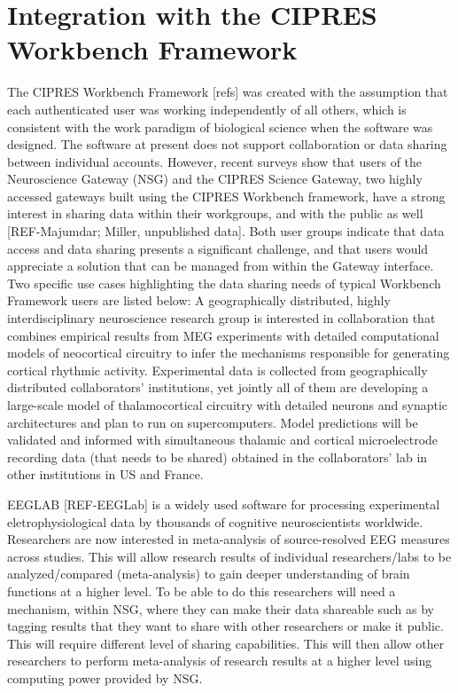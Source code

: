 \documentclass[sigconf]{acmart}
\begin{document}
\section{Integration with the CIPRES Workbench Framework}

The CIPRES Workbench Framework [refs] was created with the assumption that each authenticated user was working independently of all others, which is consistent with the work paradigm of biological science when the software was designed. The software at present does not support collaboration or data sharing between individual accounts. However, recent surveys show that users of the Neuroscience Gateway (NSG) and the CIPRES Science Gateway, two highly accessed gateways built using the CIPRES Workbench framework, have a strong interest in sharing data within their workgroups, and with the public as well [REF-Majumdar; Miller, unpublished data]. Both user groups indicate that data access and data sharing presents a significant challenge, and that users would appreciate a solution that can be managed from within the Gateway interface. Two specific use cases highlighting the data sharing needs of typical Workbench Framework users  are listed below:
A geographically distributed, highly interdisciplinary neuroscience research group is interested in collaboration that combines empirical results from MEG experiments with detailed computational models of neocortical circuitry to infer the mechanisms responsible for generating cortical rhythmic activity. Experimental data is collected from geographically distributed collaborators' institutions, yet jointly all of them are developing a large-scale model of thalamocortical circuitry with detailed neurons and synaptic architectures and plan to run on supercomputers. Model predictions will be validated and informed with simultaneous thalamic and cortical microelectrode recording data (that needs to be shared) obtained in the collaborators' lab in other institutions in US and France.

EEGLAB [REF-EEGLab] is a widely used software for processing experimental eletrophysiological data by thousands of cognitive neuroscientists worldwide. Researchers are now interested in meta-analysis of source-resolved EEG measures across studies. This will allow research results of individual researchers/labs to be analyzed/compared (meta-analysis) to gain deeper understanding of brain functions at a higher level. To be able to do this researchers will need a mechanism, within NSG, where they can make their data shareable such as by tagging results that they want to share with other researchers or make it public. This will require different level of sharing capabilities. This will then allow other researchers to perform meta-analysis of research results at a higher level using computing power provided by NSG.
\end{document}
